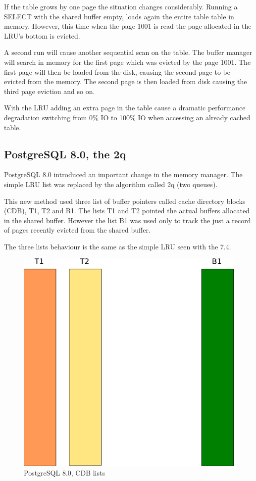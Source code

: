 If the table grows by one page the situation changes considerably. Running a SELECT with the shared buffer empty, loads again the entire table table in memory.
However, this time when the page 1001 is read the page allocated in the LRU's bottom is evicted.

A second run will cause another sequential scan on the table. The buffer manager will search in memory for the first page which was evicted by the page 1001.
The first page will then be loaded from the disk, causing the second page to be evicted from the memory. The second page is then loaded from disk causing the third page eviction and so on.

With the LRU adding an extra page in the table cause a dramatic performance degradation switching from 0\% IO to 100\% IO when accessing an already cached table.


\subsection{PostgreSQL 8.0, the 2q}
PostgreSQL 8.0 introduced an important change in the memory manager. The simple LRU list was replaced by the algorithm called 2q (two queues).\newline 

This new method used three list of buffer pointers called cache directory blocks (CDB), T1, T2 and B1. 
The lists T1 and T2 pointed the actual buffers allocated in the shared buffer. However the list B1 was used only to track the just a record of pages recently evicted from the shared buffer. 

The three lists behaviour is the same as the simple LRU seen with the 7.4. 
\begin{figure}[H]
\includegraphics[scale=0.6]{images/shared_buffer_80.png}

\caption{PostgreSQL 8.0, CDB lists}

\end{figure}

